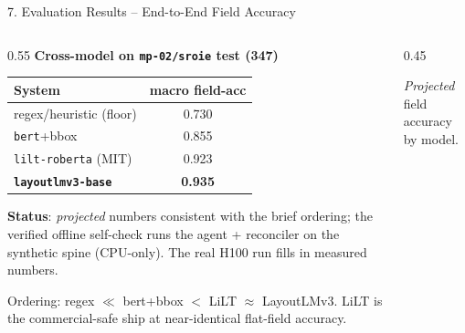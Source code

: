 \documentclass[10pt,aspectratio=169]{beamer}
\begin{document}
\begin{frame}{7. Evaluation Results -- End-to-End Field Accuracy}
\begin{columns}[T]
\begin{column}{0.55\textwidth}
\textbf{Cross-model on \texttt{mp-02/sroie} test (347)}
\begin{table}[h]
\centering\scriptsize
\begin{tabular}{lc}
\toprule
\textbf{System} & \textbf{macro field-acc} \\
\midrule
regex/heuristic (floor)      & 0.730 \\
\texttt{bert}+bbox            & 0.855 \\
\texttt{lilt-roberta} (MIT)   & 0.923 \\
\textbf{\texttt{layoutlmv3-base}} & \textbf{0.935} \\
\bottomrule
\end{tabular}
\end{table}

\scriptsize \textbf{Status}: \emph{projected} numbers consistent with the brief ordering; the verified offline self-check runs the agent + reconciler on the synthetic spine (CPU-only). The real H100 run fills in measured numbers.

\vspace{0.05cm}
\scriptsize Ordering: regex $\ll$ bert+bbox $<$ LiLT $\approx$ LayoutLMv3. LiLT is the commercial-safe ship at near-identical flat-field accuracy.
\end{column}
\begin{column}{0.45\textwidth}
\centering
{}

\scriptsize \emph{Projected} field accuracy by model.
\end{column}
\end{columns}
\end{frame}
\end{document}

